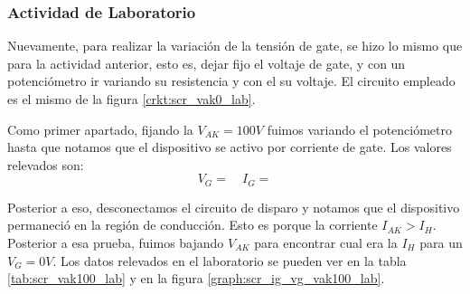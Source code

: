 
      \subsubsection{Actividad de Laboratorio}
        Nuevamente, para realizar la variación de la tensión de gate, se hizo lo mismo que para la actividad anterior,
        esto es, dejar fijo el voltaje de gate, y con un potenciómetro ir variando su resistencia y con el su voltaje.
        El circuito empleado es el mismo de la figura \ref{crkt:scr_vak0_lab}.

        Como primer apartado, fijando la $V_{AK} = 100V$ fuimos variando el potenciómetro hasta que notamos que el
        dispositivo se activo por corriente de gate. Los valores relevados son:
        \begin{equation*}
          V_G = \quad I_G =
        \end{equation*}

        Posterior a eso, desconectamos el circuito de disparo y notamos que el dispositivo permaneció en la región de
        conducción. Esto es porque la corriente $I_{AK} > I_H$. Posterior a esa prueba, fuimos bajando $V_{AK}$ para
        encontrar cual era la $I_H$ para un $V_G = 0V$. Los datos relevados en el laboratorio se pueden ver en la tabla
        \ref{tab:scr_vak100_lab} y en la figura \ref{graph:scr_ig_vg_vak100_lab}. 

